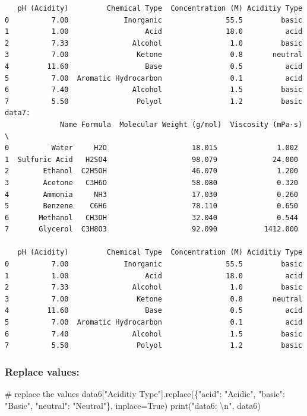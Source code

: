 \documentclass[
  letterpaper,
  DIV=11,
  numbers=noendperiod]{scrreprt}
\newenvironment{Shaded}{\begin{snugshade}}{\end{snugshade}}
\newcommand{\BuiltInTok}[1]{\textcolor[rgb]{0.00,0.23,0.31}{#1}}
\newcommand{\CharTok}[1]{\textcolor[rgb]{0.13,0.47,0.30}{#1}}
\newcommand{\CommentTok}[1]{\textcolor[rgb]{0.37,0.37,0.37}{#1}}
\newcommand{\NormalTok}[1]{\textcolor[rgb]{0.00,0.23,0.31}{#1}}
\newcommand{\OperatorTok}[1]{\textcolor[rgb]{0.37,0.37,0.37}{#1}}
\newcommand{\StringTok}[1]{\textcolor[rgb]{0.13,0.47,0.30}{#1}}
\newcommand{\VariableTok}[1]{\textcolor[rgb]{0.07,0.07,0.07}{#1}}
\begin{document}
\begin{verbatim}
   pH (Acidity)         Chemical Type  Concentration (M) Aciditiy Type  
0          7.00             Inorganic               55.5         basic  
1          1.00                  Acid               18.0          acid  
2          7.33               Alcohol                1.0         basic  
3          7.00                Ketone                0.8       neutral  
4         11.60                  Base                0.5          acid  
5          7.00  Aromatic Hydrocarbon                0.1          acid  
6          7.40               Alcohol                1.5         basic  
7          5.50                Polyol                1.2         basic  
data7: 
             Name Formula  Molecular Weight (g/mol)  Viscosity (mPa·s)  \
0          Water     H2O                    18.015              1.002   
1  Sulfuric Acid   H2SO4                    98.079             24.000   
2        Ethanol  C2H5OH                    46.070              1.200   
3        Acetone   C3H6O                    58.080              0.320   
4        Ammonia     NH3                    17.030              0.260   
5        Benzene    C6H6                    78.110              0.650   
6       Methanol   CH3OH                    32.040              0.544   
7       Glycerol  C3H8O3                    92.090           1412.000   

   pH (Acidity)         Chemical Type  Concentration (M) Aciditiy Type  
0          7.00             Inorganic               55.5         basic  
1          1.00                  Acid               18.0          acid  
2          7.33               Alcohol                1.0         basic  
3          7.00                Ketone                0.8       neutral  
4         11.60                  Base                0.5          acid  
5          7.00  Aromatic Hydrocarbon                0.1          acid  
6          7.40               Alcohol                1.5         basic  
7          5.50                Polyol                1.2         basic  
\end{verbatim}

\subsubsection*{Replace values:}\label{replace-values}

\begin{Shaded}
\begin{Highlighting}[]
\CommentTok{\# replace the values}
\NormalTok{data6[}\StringTok{"Aciditiy Type"}\NormalTok{].replace(\{}\StringTok{"acid"}\NormalTok{: }\StringTok{"Acidic"}\NormalTok{, }\StringTok{"basic"}\NormalTok{: }\StringTok{"Basic"}\NormalTok{, }\StringTok{"neutral"}\NormalTok{: }\StringTok{"Neutral"}\NormalTok{\}, inplace}\OperatorTok{=}\VariableTok{True}\NormalTok{)}
\BuiltInTok{print}\NormalTok{(}\StringTok{"data6: }\CharTok{\textbackslash{}n}\StringTok{"}\NormalTok{, data6)}
\end{Highlighting}
\end{Shaded}
\end{document}
